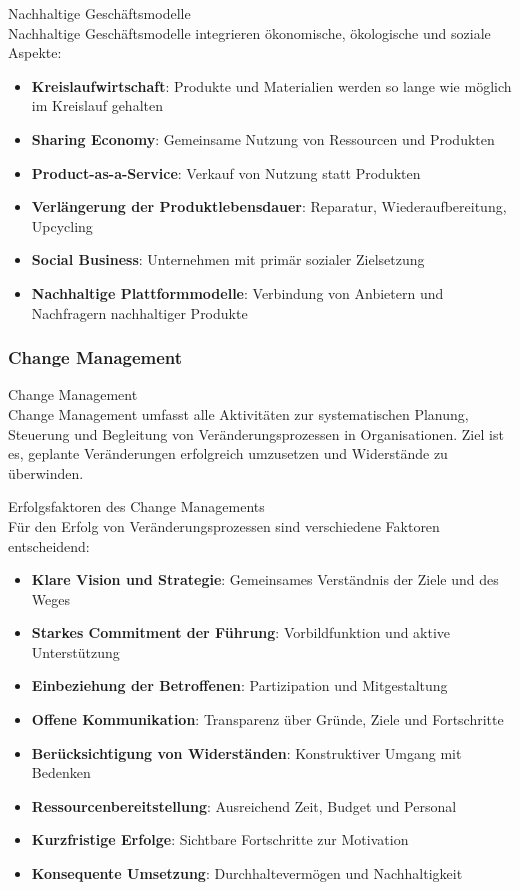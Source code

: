 \begin{concept}{Nachhaltige Geschäftsmodelle}\\
Nachhaltige Geschäftsmodelle integrieren ökonomische, ökologische und soziale Aspekte:
\begin{itemize}
    \item \textbf{Kreislaufwirtschaft}: Produkte und Materialien werden so lange wie möglich im Kreislauf gehalten
    \item \textbf{Sharing Economy}: Gemeinsame Nutzung von Ressourcen und Produkten
    \item \textbf{Product-as-a-Service}: Verkauf von Nutzung statt Produkten
    \item \textbf{Verlängerung der Produktlebensdauer}: Reparatur, Wiederaufbereitung, Upcycling
    \item \textbf{Social Business}: Unternehmen mit primär sozialer Zielsetzung
    \item \textbf{Nachhaltige Plattformmodelle}: Verbindung von Anbietern und Nachfragern nachhaltiger Produkte
\end{itemize}
\end{concept}

\subsubsection{Change Management}

\begin{definition}{Change Management}\\
Change Management umfasst alle Aktivitäten zur systematischen Planung, Steuerung und Begleitung von Veränderungsprozessen in Organisationen. Ziel ist es, geplante Veränderungen erfolgreich umzusetzen und Widerstände zu überwinden.
\end{definition}

\begin{concept}{Erfolgsfaktoren des Change Managements}\\
Für den Erfolg von Veränderungsprozessen sind verschiedene Faktoren entscheidend:
\begin{itemize}
    \item \textbf{Klare Vision und Strategie}: Gemeinsames Verständnis der Ziele und des Weges
    \item \textbf{Starkes Commitment der Führung}: Vorbildfunktion und aktive Unterstützung
    \item \textbf{Einbeziehung der Betroffenen}: Partizipation und Mitgestaltung
    \item \textbf{Offene Kommunikation}: Transparenz über Gründe, Ziele und Fortschritte
    \item \textbf{Berücksichtigung von Widerständen}: Konstruktiver Umgang mit Bedenken
    \item \textbf{Ressourcenbereitstellung}: Ausreichend Zeit, Budget und Personal
    \item \textbf{Kurzfristige Erfolge}: Sichtbare Fortschritte zur Motivation
    \item \textbf{Konsequente Umsetzung}: Durchhaltevermögen und Nachhaltigkeit
\end{itemize}
\end{concept}


